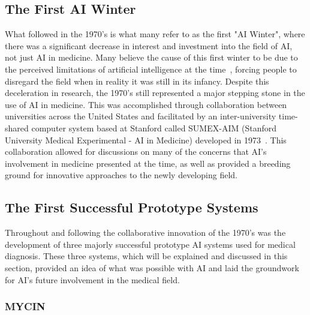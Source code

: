 \documentclass[a4paper]{article}
\begin{document}
\subsection{The First AI Winter}

What followed in the 1970's is what many refer to as the first "AI Winter", where there was a significant decrease in interest and investment into the field of AI, not just AI in medicine. Many believe the cause of this first winter to be due to the perceived limitations of artificial intelligence at the time~\cite{kaul_history_2020}, forcing people to disregard the field when in reality it was still in its infancy. Despite this deceleration in research, the 1970's still represented a major stepping stone in the use of AI in medicine. This was accomplished through collaboration between universities across the United States and facilitated by an inter-university time-shared computer system based at Stanford called SUMEX-AIM (Stanford University Medical Experimental - AI in Medicine) developed in 1973~\cite{kulikowski_beginnings_2019}. This collaboration allowed for discussions on many of the concerns that AI's involvement in medicine presented at the time, as well as provided a breeding ground for innovative approaches to the newly developing field. 

\subsection{The First Successful Prototype Systems}

Throughout and following the collaborative innovation of the 1970's was the development of three majorly successful prototype AI systems used for medical diagnosis. These three systems, which will be explained and discussed in this section, provided an idea of what was possible with AI and laid the groundwork for AI's future involvement in the medical field.

\subsubsection{MYCIN}
\end{document}
